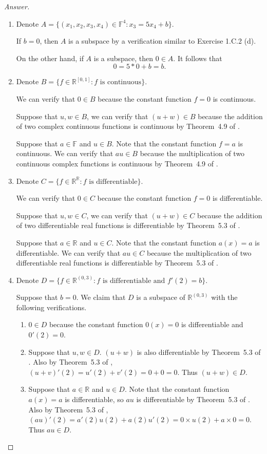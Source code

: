 \begin{proof}[Answer]
\begin{enumerate}[label=(\alph*)]
\item Denote $A=\{(x_1,x_2,x_3,x_4)\in\mathbb{F}^4: x_3=5x_4+b\}$.

If $b=0$, then $A$ is a subspace by a verification similar to Exercise 1.C.2 (d).

On the other hand, if $A$ is a subspace, then $0\in A$. It follows that
\[
0=5*0+b=b.
\]
\item Denote $B=\{f\in\mathbb{R}^{[0,1]}:f \text{ is continuous}\}$.

We can verify that $0\in B$ because the constant function $f=0$ is continuous.

Suppose that $u,w\in B$, we can verify that $(u+w)\in B$ because the addition of two complex continuous functions is continuous by Theorem~4.9 of \cite{rudin1976principles}.

Suppose that $a\in\mathbb{F}$ and $u\in B$. Note that the constant function $f=a$ is continuous. We can verify that $au\in B$ because the multiplication of two continuous complex functions is continuous by Theorem~4.9 of \cite{rudin1976principles}.
\item Denote $C=\{f\in\mathbb{R}^{\mathbb{R}}:f \text{ is differentiable}\}$.

We can verify that $0\in C$ because the constant function $f=0$ is differentiable.

Suppose that $u,w\in C$, we can verify that $(u+w)\in C$ because the addition of two differentiable real functions is differentiable by Theorem~5.3 of \cite{rudin1976principles}.

Suppose that $a\in\mathbb{R}$ and $u\in C$. Note that the constant function $a(x)=a$ is differentiable. We can verify that $au\in C$ because the multiplication of two differentiable real functions is differentiable by Theorem~5.3 of \cite{rudin1976principles}.
\item Denote $D=\{f\in\mathbb{R}^{(0,3)}:f \text{ is differentiable and }f'(2)=b\}$.

Suppose that $b=0$. We claim that $D$ is a subspace of $\mathbb{R}^{(0,3)}$ with the following verifications.
\begin{enumerate}[label=(\roman*)]
\item $0\in D$ because the constant function $0(x)=0$ is differentiable and $0'(2)=0$.
\item Suppose that $u,w\in D$. $(u+w)$ is also differentiable by Theorem~5.3 of \cite{rudin1976principles}. Also by Theorem~5.3 of \cite{rudin1976principles}, $(u+v)'(2)=u'(2)+v'(2)=0+0=0$. Thus $(u+w)\in D$.
\item Suppose that $a\in\mathbb{R}$ and $u\in D$. Note that the constant function $a(x)=a$ is differentiable, so $au$ is differentiable by Theorem~5.3 of \cite{rudin1976principles}. Also by Theorem~5.3 of \cite{rudin1976principles}, $(au)'(2)=a'(2)u(2)+a(2)u'(2)=0\times u(2)+a\times0=0$. Thus $au\in D$.
\end{enumerate}


\end{enumerate}
\end{proof}
